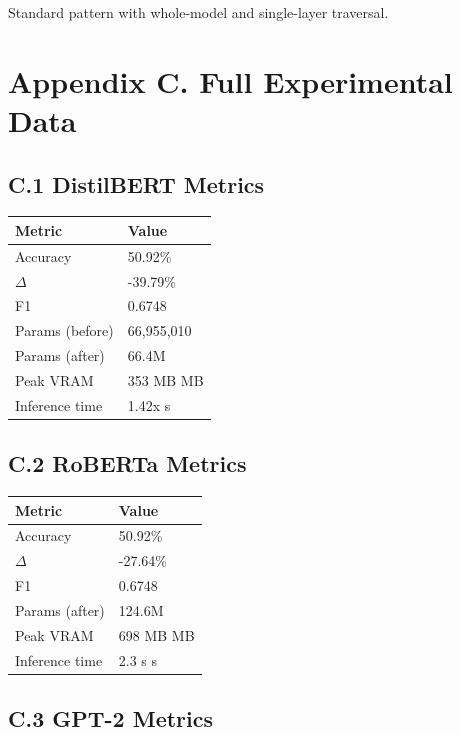 Standard pattern with whole-model and single-layer traversal.




\section{Appendix C. Full Experimental Data}

\subsection{C.1 DistilBERT Metrics}

\begin{table}[H]
\centering
\small
\begin{tabular}{ll}
\toprule
\textbf{Metric} & \textbf{Value} \\
\midrule
Accuracy & 50.92\% \\
$\Delta$ & -39.79\% \\
F1 & 0.6748 \\
Params (before) & 66,955,010 \\
Params (after) & 66.4M \\
Peak VRAM & 353 MB MB \\
Inference time & 1.42x s \\
\bottomrule
\end{tabular}
\end{table}

\subsection{C.2 RoBERTa Metrics}

\begin{table}[H]
\centering
\small
\begin{tabular}{ll}
\toprule
\textbf{Metric} & \textbf{Value} \\
\midrule
Accuracy & 50.92\% \\
$\Delta$ & -27.64\% \\
F1 & 0.6748 \\
Params (after) & 124.6M \\
Peak VRAM & 698 MB MB \\
Inference time & 2.3 s s \\
\bottomrule
\end{tabular}
\end{table}

\subsection{C.3 GPT-2 Metrics}

